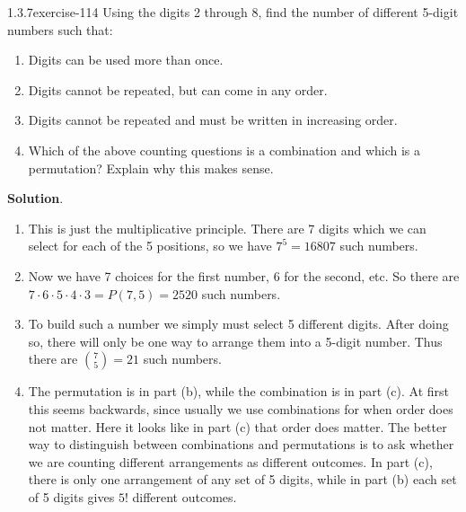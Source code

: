 \documentclass[twoside,11pt,]{book}
\numberwithin{equation}{chapter}
\begin{document}
\begin{divisionsolution}{1.3.7}{}{exercise-114}%
\hypertarget{p-1866}{}%
Using the digits 2 through 8, find the number of different 5-digit numbers such that:\leavevmode%
\begin{enumerate}[label=(\alph*)]
\item\hypertarget{li-1252}{}\hypertarget{p-1867}{}%
Digits can be used more than once.%
\item\hypertarget{li-1253}{}\hypertarget{p-1869}{}%
Digits cannot be repeated, but can come in any order.%
\item\hypertarget{li-1254}{}\hypertarget{p-1871}{}%
Digits cannot be repeated and must be written in increasing order.%
\item\hypertarget{li-1255}{}\hypertarget{p-1873}{}%
Which of the above counting questions is a combination and which is a permutation? Explain why this makes sense.%
\end{enumerate}
%
\par\smallskip%
\noindent\textbf{Solution}.\quad%
\hypertarget{p-1874}{}%
\leavevmode%
\begin{enumerate}[label=(\alph*)]
\item\hypertarget{li-1256}{}\hypertarget{p-1875}{}%
This is just the multiplicative principle. There are 7 digits which we can select for each of the 5 positions, so we have \(7^5 = 16807\) such numbers.%
\item\hypertarget{li-1257}{}\hypertarget{p-1876}{}%
Now we have 7 choices for the first number, 6 for the second, etc. So there are \(7 \cdot 6 \cdot 5 \cdot 4 \cdot 3 = P(7,5) = 2520\) such numbers.%
\item\hypertarget{li-1258}{}\hypertarget{p-1877}{}%
To build such a number we simply must select 5 different digits. After doing so, there will only be one way to arrange them into a 5-digit number. Thus there are \({7 \choose 5} = 21\) such numbers.%
\item\hypertarget{li-1259}{}\hypertarget{p-1878}{}%
The permutation is in part (b), while the combination is in part (c). At first this seems backwards, since usually we use combinations for when order does not matter. Here it looks like in part (c) that order does matter. The better way to distinguish between combinations and permutations is to ask whether we are counting different arrangements as different outcomes. In part (c), there is only one arrangement of any set of 5 digits, while in part (b) each set of 5 digits gives \(5!\) different outcomes.%
\end{enumerate}
%
\end{divisionsolution}%
\end{document}
